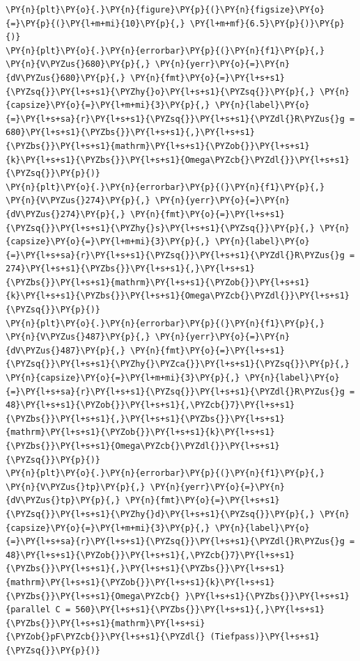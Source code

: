 \begin{tcolorbox}[breakable, size=fbox, boxrule=1pt, pad at break*=1mm,colback=cellbackground, colframe=cellborder]
\begin{Verbatim}[commandchars=\\\{\}]
\PY{n}{plt}\PY{o}{.}\PY{n}{figure}\PY{p}{(}\PY{n}{figsize}\PY{o}{=}\PY{p}{(}\PY{l+m+mi}{10}\PY{p}{,} \PY{l+m+mf}{6.5}\PY{p}{)}\PY{p}{)}
\PY{n}{plt}\PY{o}{.}\PY{n}{errorbar}\PY{p}{(}\PY{n}{f1}\PY{p}{,} \PY{n}{V\PYZus{}680}\PY{p}{,} \PY{n}{yerr}\PY{o}{=}\PY{n}{dV\PYZus{}680}\PY{p}{,} \PY{n}{fmt}\PY{o}{=}\PY{l+s+s1}{\PYZsq{}}\PY{l+s+s1}{\PYZhy{}o}\PY{l+s+s1}{\PYZsq{}}\PY{p}{,} \PY{n}{capsize}\PY{o}{=}\PY{l+m+mi}{3}\PY{p}{,} \PY{n}{label}\PY{o}{=}\PY{l+s+sa}{r}\PY{l+s+s1}{\PYZsq{}}\PY{l+s+s1}{\PYZdl{}R\PYZus{}g = 680}\PY{l+s+s1}{\PYZbs{}}\PY{l+s+s1}{,}\PY{l+s+s1}{\PYZbs{}}\PY{l+s+s1}{mathrm}\PY{l+s+s1}{\PYZob{}}\PY{l+s+s1}{k}\PY{l+s+s1}{\PYZbs{}}\PY{l+s+s1}{Omega\PYZcb{}\PYZdl{}}\PY{l+s+s1}{\PYZsq{}}\PY{p}{)}
\PY{n}{plt}\PY{o}{.}\PY{n}{errorbar}\PY{p}{(}\PY{n}{f1}\PY{p}{,} \PY{n}{V\PYZus{}274}\PY{p}{,} \PY{n}{yerr}\PY{o}{=}\PY{n}{dV\PYZus{}274}\PY{p}{,} \PY{n}{fmt}\PY{o}{=}\PY{l+s+s1}{\PYZsq{}}\PY{l+s+s1}{\PYZhy{}s}\PY{l+s+s1}{\PYZsq{}}\PY{p}{,} \PY{n}{capsize}\PY{o}{=}\PY{l+m+mi}{3}\PY{p}{,} \PY{n}{label}\PY{o}{=}\PY{l+s+sa}{r}\PY{l+s+s1}{\PYZsq{}}\PY{l+s+s1}{\PYZdl{}R\PYZus{}g = 274}\PY{l+s+s1}{\PYZbs{}}\PY{l+s+s1}{,}\PY{l+s+s1}{\PYZbs{}}\PY{l+s+s1}{mathrm}\PY{l+s+s1}{\PYZob{}}\PY{l+s+s1}{k}\PY{l+s+s1}{\PYZbs{}}\PY{l+s+s1}{Omega\PYZcb{}\PYZdl{}}\PY{l+s+s1}{\PYZsq{}}\PY{p}{)}
\PY{n}{plt}\PY{o}{.}\PY{n}{errorbar}\PY{p}{(}\PY{n}{f1}\PY{p}{,} \PY{n}{V\PYZus{}487}\PY{p}{,} \PY{n}{yerr}\PY{o}{=}\PY{n}{dV\PYZus{}487}\PY{p}{,} \PY{n}{fmt}\PY{o}{=}\PY{l+s+s1}{\PYZsq{}}\PY{l+s+s1}{\PYZhy{}\PYZca{}}\PY{l+s+s1}{\PYZsq{}}\PY{p}{,} \PY{n}{capsize}\PY{o}{=}\PY{l+m+mi}{3}\PY{p}{,} \PY{n}{label}\PY{o}{=}\PY{l+s+sa}{r}\PY{l+s+s1}{\PYZsq{}}\PY{l+s+s1}{\PYZdl{}R\PYZus{}g = 48}\PY{l+s+s1}{\PYZob{}}\PY{l+s+s1}{,\PYZcb{}7}\PY{l+s+s1}{\PYZbs{}}\PY{l+s+s1}{,}\PY{l+s+s1}{\PYZbs{}}\PY{l+s+s1}{mathrm}\PY{l+s+s1}{\PYZob{}}\PY{l+s+s1}{k}\PY{l+s+s1}{\PYZbs{}}\PY{l+s+s1}{Omega\PYZcb{}\PYZdl{}}\PY{l+s+s1}{\PYZsq{}}\PY{p}{)}
\PY{n}{plt}\PY{o}{.}\PY{n}{errorbar}\PY{p}{(}\PY{n}{f1}\PY{p}{,} \PY{n}{V\PYZus{}tp}\PY{p}{,} \PY{n}{yerr}\PY{o}{=}\PY{n}{dV\PYZus{}tp}\PY{p}{,} \PY{n}{fmt}\PY{o}{=}\PY{l+s+s1}{\PYZsq{}}\PY{l+s+s1}{\PYZhy{}d}\PY{l+s+s1}{\PYZsq{}}\PY{p}{,} \PY{n}{capsize}\PY{o}{=}\PY{l+m+mi}{3}\PY{p}{,} \PY{n}{label}\PY{o}{=}\PY{l+s+sa}{r}\PY{l+s+s1}{\PYZsq{}}\PY{l+s+s1}{\PYZdl{}R\PYZus{}g = 48}\PY{l+s+s1}{\PYZob{}}\PY{l+s+s1}{,\PYZcb{}7}\PY{l+s+s1}{\PYZbs{}}\PY{l+s+s1}{,}\PY{l+s+s1}{\PYZbs{}}\PY{l+s+s1}{mathrm}\PY{l+s+s1}{\PYZob{}}\PY{l+s+s1}{k}\PY{l+s+s1}{\PYZbs{}}\PY{l+s+s1}{Omega\PYZcb{} }\PY{l+s+s1}{\PYZbs{}}\PY{l+s+s1}{parallel C = 560}\PY{l+s+s1}{\PYZbs{}}\PY{l+s+s1}{,}\PY{l+s+s1}{\PYZbs{}}\PY{l+s+s1}{mathrm}\PY{l+s+si}{\PYZob{}pF\PYZcb{}}\PY{l+s+s1}{\PYZdl{} (Tiefpass)}\PY{l+s+s1}{\PYZsq{}}\PY{p}{)}

\end{Verbatim}
\end{tcolorbox}
